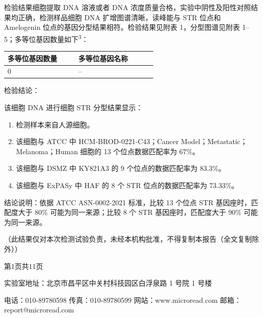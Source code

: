 \documentclass[UTF8,10pt,a4paper,fontset=fandol]{ctexart}
\newcommand{\fieldvalue}[1]{#1}
\begin{document}
\noindent
检验结果细胞提取 DNA 溶液或者 DNA 浓度质量合格，实验中阴性及阳性对照结果均正确，检测样品细胞 DNA 扩增图谱清晰，读峰能与 STR 位点和 Amelogenin 位点的基因分型结果相符。检验结果见附表 1，分型图谱见附表 1--5；多等位基因数量如下\textsuperscript{3}：

\begin{center}
\begin{tabular}{|p{0.38\linewidth}|p{0.42\linewidth}|}
\hline
多等位基因数量 & 多等位基因名称 \\
\hline
\fieldvalue{0} &
\fieldvalue{--} \\
\hline
\end{tabular}
\end{center}

\noindent
检验结论：

\medskip

\noindent
该细胞 DNA 进行细胞 STR 分型结果显示：

\begin{enumerate}
\item 检测样本来自人源细胞。
\item 该细胞与 ATCC 中 HCM-BROD-0221-C43；Cancer Model；Metastatic；Melanoma；Human 细胞的 13 个位点数据匹配率为 67\%。
\item 该细胞与 DSMZ 中 KY821A3 的 9 个位点的数据匹配率为 83.3\%。
\item 该细胞与 ExPASy 中 HAF 的 8 个 STR 位点的数据匹配率为 73.33\%。
\end{enumerate}

\noindent
结论说明：依据 ATCC ASN-0002-2021 标准，比较 13 个位点 STR 基因座时，匹配度大于 80\% 可能为同一来源；比较 8 个 STR 基因座时，匹配度大于 90\% 可能为同一来源。

\begin{center}
（此结果仅对本次检测试验负责，未经本机构批准，不得复制本报告（全文复制除外））
\end{center}

\begin{center}
第1页共11页
\end{center}

\noindent
实验室地址：北京市昌平区中关村科技园区白浮泉路 1 号院 1 号楼

\noindent
电话：010-89780598 传真：010-89780599 网站：www.microread.com 邮箱：report@microread.com

\newpage
\end{document}
